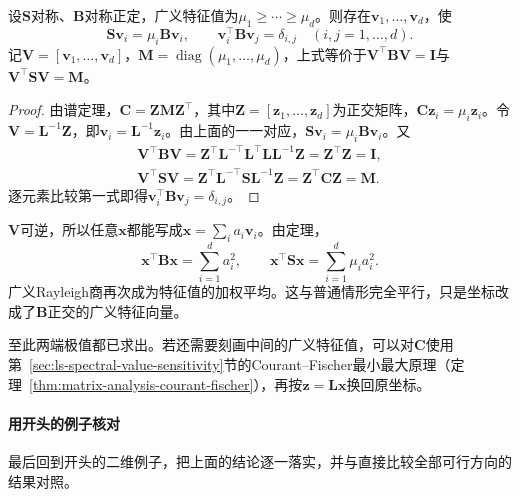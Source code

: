 \begin{theorem}[$\bm B$正交的广义特征向量]
\label{thm:ls-generalized-eigen-b-orthogonal}
设$\bm S$对称、$\bm B$对称正定，广义特征值为$\mu_1\geq\cdots\geq\mu_d$。则存在$\bm v_1,\ldots,\bm v_d$，使
\begin{equation}
 \bm S\bm v_i=\mu_i\bm B\bm v_i,\qquad \bm v_i^\top\bm B\bm v_j=\delta_{i,j}\quad(i,j=1,\ldots,d).
 \label{eq:ls-generalized-eigen-b-orthogonal}
\end{equation}
记$\bm V=[\bm v_1,\ldots,\bm v_d]$，$\bm M=\operatorname{diag}(\mu_1,\ldots,\mu_d)$，上式等价于$\bm V^\top\bm B\bm V=\bm I$与$\bm V^\top\bm S\bm V=\bm M$。
\end{theorem}
\begin{proof}
由谱定理，$\bm C=\bm Z\bm M\bm Z^\top$，其中$\bm Z=[\bm z_1,\ldots,\bm z_d]$为正交矩阵，$\bm C\bm z_i=\mu_i\bm z_i$。令$\bm V=\bm L^{-1}\bm Z$，即$\bm v_i=\bm L^{-1}\bm z_i$。由上面的一一对应，$\bm S\bm v_i=\mu_i\bm B\bm v_i$。又
\[
\begin{gathered}
 \bm V^\top\bm B\bm V=\bm Z^\top\bm L^{-\top}\bm L^\top\bm L\bm L^{-1}\bm Z=\bm Z^\top\bm Z=\bm I,\\
 \bm V^\top\bm S\bm V=\bm Z^\top\bm L^{-\top}\bm S\bm L^{-1}\bm Z=\bm Z^\top\bm C\bm Z=\bm M .
\end{gathered}
\]
逐元素比较第一式即得$\bm v_i^\top\bm B\bm v_j=\delta_{i,j}$。
\end{proof}

$\bm V$可逆，所以任意$\bm x$都能写成$\bm x=\sum_ia_i\bm v_i$。由定理，
\[
 \bm x^\top\bm B\bm x=\sum_{i=1}^da_i^2,\qquad \bm x^\top\bm S\bm x=\sum_{i=1}^d\mu_ia_i^2 .
\]
广义Rayleigh商再次成为特征值的加权平均。这与普通情形完全平行，只是坐标改成了$\bm B$正交的广义特征向量。

至此两端极值都已求出。若还需要刻画中间的广义特征值，可以对$\bm C$使用第~\ref{sec:ls-spectral-value-sensitivity}节的Courant--Fischer最小最大原理（定理~\ref{thm:matrix-analysis-courant-fischer}），再按$\bm z=\bm L\bm x$换回原坐标。

\paragraph{用开头的例子核对}
最后回到开头的二维例子，把上面的结论逐一落实，并与直接比较全部可行方向的结果对照。

